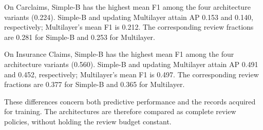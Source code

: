 On Carclaims, Simple-B has the highest mean F1 among the four architecture variants (0.224). Simple-B and updating Multilayer attain AP 0.153 and 0.140, respectively; Multilayer's mean F1 is 0.212. The corresponding review fractions are 0.281 for Simple-B and 0.253 for Multilayer.

On Insurance Claims, Simple-B has the highest mean F1 among the four architecture variants (0.560). Simple-B and updating Multilayer attain AP 0.491 and 0.452, respectively; Multilayer's mean F1 is 0.497. The corresponding review fractions are 0.377 for Simple-B and 0.365 for Multilayer.

These differences concern both predictive performance and the records acquired for training. The architectures are therefore compared as complete review policies, without holding the review budget constant.
